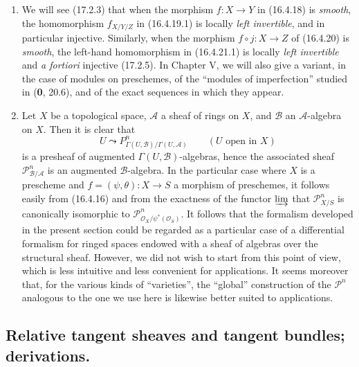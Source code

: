 \begin{remarks}[16.4.24]
\label{IV.16.4.24}
\begin{enumerate}
\item[(i)] We will see (17.2.3) that when the morphism $f:X\to Y$ in
(16.4.18) is \emph{smooth}, the homomorphism $f_{X/Y/Z}$ in (16.4.19.1) is
locally \emph{left invertible}, and in particular injective. Similarly,
when the morphism $f\circ j:X\to Z$ of (16.4.20) is \emph{smooth},
the left-hand homomorphism in (16.4.21.1) is locally
\emph{left invertible} and \emph{a fortiori} injective (17.2.5). In Chapter V,
we will also give a variant, in the case of modules on preschemes, of the
``modules of imperfection'' studied in (\textbf{0}, 20.6), and of the exact sequences in
which they appear.

\item[(ii)] Let $X$ be a topological space, $\mathscr{A}$ a sheaf
of rings on $X$, and $\mathscr{B}$ an $\mathscr{A}$-algebra on $X$. Then it
is clear that
\[
  U\leadsto
  P_{\Gamma(U,\mathscr{B})/\Gamma(U,\mathscr{A})}^n
  \qquad (U\text{ open in }X)
\]
is a presheaf of augmented $\Gamma(U,\mathscr{B})$-algebras, hence the
associated sheaf $\mathscr{P}_{\mathscr{B}/\mathscr{A}}^n$ is an augmented
$\mathscr{B}$-algebra. In the particular case where $X$ is a
prescheme and $f=(\psi,\theta):X\to S$ a morphism of preschemes, it follows
easily from (16.4.16) and from the exactness of the functor $\varinjlim$ that
$\mathscr{P}_{X/S}^n$ is canonically isomorphic to
$\mathscr{P}_{\mathcal{O}_X/\psi^*(\mathcal{O}_S)}^n$. It follows that the
formalism developed in the present section could be regarded as
a
particular case of a differential formalism for ringed spaces endowed with
a sheaf of algebras over the structural sheaf. However, we did not wish
to start from this point of view, which is less intuitive and less convenient
for applications. It seems moreover that, for the various kinds of
``varieties'', the ``global'' construction of the $\mathscr{P}^n$ analogous to
the one we use here is likewise better suited to applications.
\end{enumerate}
\end{remarks}


\subsection{Relative tangent sheaves and tangent bundles; derivations.}

